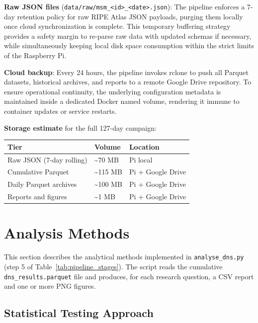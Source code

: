\textbf{Raw JSON files} (\texttt{data/raw/msm\_<id>\_<date>.json}): The pipeline enforces a 7-day retention policy for raw RIPE Atlas JSON payloads, purging them locally once cloud synchronization is complete. This temporary buffering strategy provides a safety margin to re-parse raw data with updated schemas if necessary, while simultaneously keeping local disk space consumption within the strict limits of the Raspberry Pi.

\textbf{Cloud backup}: Every 24 hours, the pipeline invokes rclone to push all Parquet datasets, historical archives, and reports to a remote Google Drive repository. To ensure operational continuity, the underlying configuration metadata is maintained inside a dedicated Docker named volume, rendering it immune to container updates or service restarts.

\textbf{Storage estimate} for the full 127-day campaign:

\begin{table}[H]
\centering
\small
\begin{tabular}{l l l}
\toprule
\textbf{Tier} & \textbf{Volume} & \textbf{Location} \\
\midrule
Raw JSON (7-day rolling) & \textasciitilde{}70 MB & Pi local \\
Cumulative Parquet & \textasciitilde{}115 MB & Pi + Google Drive \\
Daily Parquet archives & \textasciitilde{}100 MB & Pi + Google Drive \\
Reports and figures & \textasciitilde{}1 MB & Pi + Google Drive \\
\bottomrule
\end{tabular}
\end{table}

\bigskip
\section{Analysis Methods}
\label{sec:3.5}

This section describes the analytical methods implemented in \texttt{analyse\_dns.py} (step 5 of Table~\ref{tab:pipeline_stages}). The script reads the cumulative \texttt{dns\_results.parquet} file and produces, for each research question, a CSV report and one or more PNG figures.

\subsection{Statistical Testing Approach}
\label{subsec:3.5.1}

